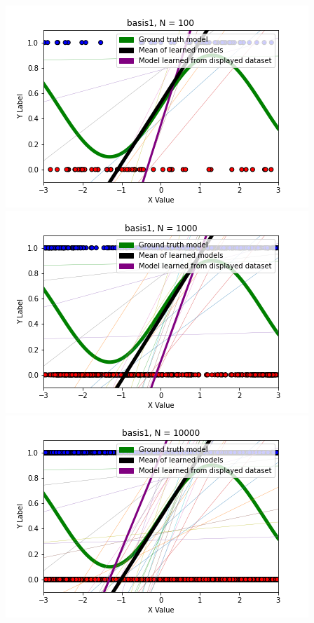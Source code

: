 \documentclass[submit]{harvardml}
\begin{document}
\begin{enumerate}
            \includegraphics[scale=0.3]{solutions/T2_P1_plots/basis1, N = 100.png}
            \includegraphics[scale=0.3]{solutions/T2_P1_plots/basis1, N = 1000.png}
            \includegraphics[scale=0.3]{solutions/T2_P1_plots/basis1, N = 10000.png}


\end{enumerate}
\end{document}
